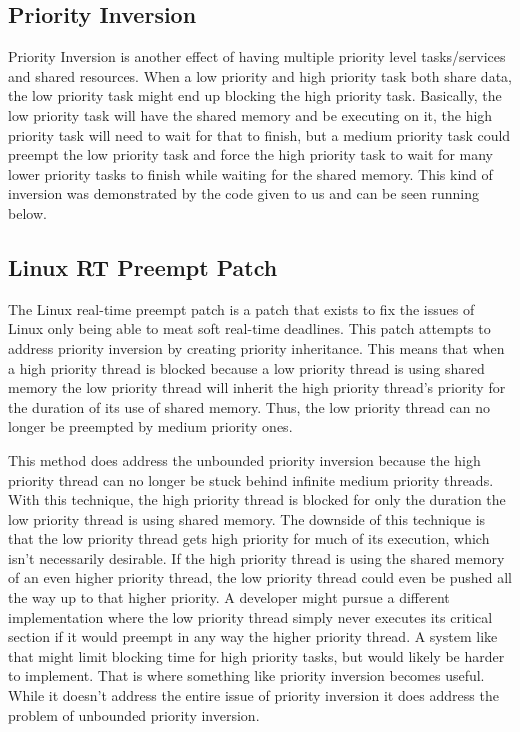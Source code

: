 \documentclass{article}
\begin{document}
\subsection*{Priority Inversion}
Priority Inversion is another effect of having multiple priority level tasks/services and shared resources. When a low priority and high priority task both share data, the low priority task might end up blocking the high priority task. Basically, the low priority task will have the shared memory and be executing on it, the high priority task will need to wait for that to finish, but a medium priority task could preempt the low priority task and force the high priority task to wait for many lower priority tasks to finish while waiting for the shared memory. This kind of inversion was demonstrated by the code given to us and can be seen running below.

\subsection*{Linux RT Preempt Patch}
The Linux real-time preempt patch is a patch that exists to fix the issues of Linux only being able to meat soft real-time deadlines. This patch attempts to address priority inversion by creating priority inheritance. This means that when a high priority thread is blocked because a low priority thread is using shared memory the low priority thread will inherit the high priority thread's priority for the duration of its use of shared memory. Thus, the low priority thread can no longer be preempted by medium priority ones.

This method does address the unbounded priority inversion because the high priority thread can no longer be stuck behind infinite medium priority threads. With this technique, the high priority thread is blocked for only the duration the low priority thread is using shared memory. The downside of this technique is that the low priority thread gets high priority for much of its execution, which isn't necessarily desirable. If the high priority thread is using the shared memory of an even higher priority thread, the low priority thread could even be pushed all the way up to that higher priority. A developer might pursue a different implementation where the low priority thread simply never executes its critical section if it would preempt in any way the higher priority thread. A system like that might limit blocking time for high priority tasks, but would likely be harder to implement. That is where something like priority inversion becomes useful. While it doesn't address the entire issue of priority inversion it does address the problem of unbounded priority inversion.
\end{document}

